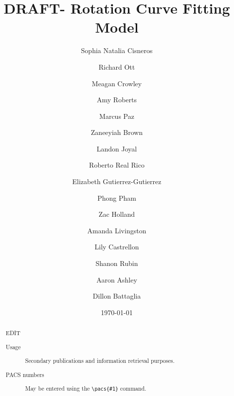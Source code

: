 \documentclass[reprint,%
 amsmath,amssymb,
 aps,
]{revtex4-1}
\begin{document}

\title{DRAFT- Rotation Curve Fitting Model }%


 

\author{Sophia Natalia Cisneros}
  \author{Richard Ott}%
 \author{ Meagan Crowley}
\email{ }
%
 \author{ Amy Roberts}
\email{ }
%
\author{Marcus Paz}
\author{Zaneeyiah Brown}
\author{Landon Joyal}
\author{Roberto Real Rico}
\author{Elizabeth Gutierrez-Gutierrez}
\author{ Phong Pham}
\author{Zac Holland}
\author{Amanda Livingston}
\author{Lily Castrellon}
\author{Shanon Rubin}
\author{Aaron Ashley}
\author{Dillon Battaglia}
%
 
 
\date{\today}%
\begin{abstract}
 
 
{\color{teal}  EDIT    }

\begin{description}
\item[Usage]
Secondary publications and information retrieval purposes.
\item[PACS numbers]
May be entered using the \verb+\pacs{#1}+ command.
\end{description}
\end{abstract}

\maketitle
\end{document}
